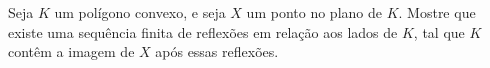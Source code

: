 Seja $K$ um polígono convexo, e seja $X$ um ponto no plano de $K$. Mostre que existe uma sequência finita de reflexões em relação aos lados de $K$, tal que $K$ contêm a imagem de $X$ após essas reflexões.

